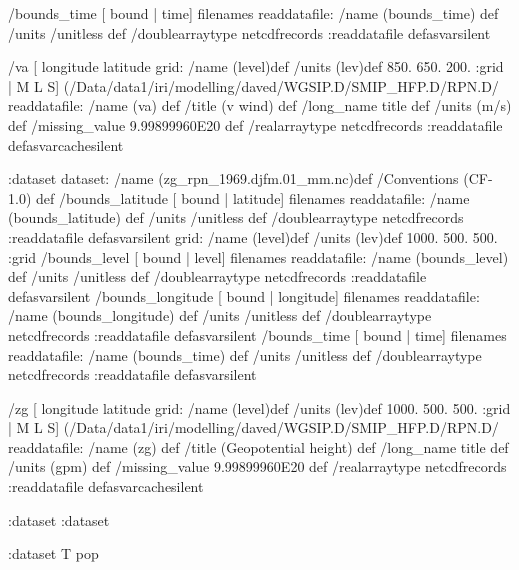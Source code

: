  /bounds_time{
[ bound | time] filenames readdatafile:
/name (bounds_time) def
 /units /unitless def
 /doublearraytype netcdfrecords :readdatafile
}defasvarsilent
\begin{ingrid}
 /va{
[ longitude latitude
grid:
/name (level)def
/units (lev)def
 850. 650. 200.
:grid
 | M L S]
(/Data/data1/iri/modelling/daved/WGSIP.D/SMIP_HFP.D/RPN.D/%
readdatafile:
/name (va) def
 /title (v wind) def
/long_name title def
 /units (m/s) def
 /missing_value 9.99899960E20 def
 /realarraytype netcdfrecords :readdatafile
}defasvarcachesilent
\end{ingrid}
:dataset
dataset:
/name (zg_rpn_1969.djfm.01_mm.nc)def
 /Conventions (CF-1.0) def
 /bounds_latitude{
[ bound | latitude] filenames readdatafile:
/name (bounds_latitude) def
 /units /unitless def
 /doublearraytype netcdfrecords :readdatafile
}defasvarsilent
grid:
/name (level)def
/units (lev)def
 1000. 500. 500.
:grid
 /bounds_level{
[ bound | level] filenames readdatafile:
/name (bounds_level) def
 /units /unitless def
 /doublearraytype netcdfrecords :readdatafile
}defasvarsilent
 /bounds_longitude{
[ bound | longitude] filenames readdatafile:
/name (bounds_longitude) def
 /units /unitless def
 /doublearraytype netcdfrecords :readdatafile
}defasvarsilent
 /bounds_time{
[ bound | time] filenames readdatafile:
/name (bounds_time) def
 /units /unitless def
 /doublearraytype netcdfrecords :readdatafile
}defasvarsilent
\begin{ingrid}
 /zg{
[ longitude latitude 
grid:
/name (level)def
/units (lev)def
 1000. 500. 500.
:grid
| M L S]
(/Data/data1/iri/modelling/daved/WGSIP.D/SMIP_HFP.D/RPN.D/%
readdatafile:
/name (zg) def
 /title (Geopotential height) def
/long_name title def
 /units  (gpm) def
 /missing_value 9.99899960E20 def
 /realarraytype netcdfrecords :readdatafile
}defasvarcachesilent
\end{ingrid}
:dataset
:dataset
\begin{ingrid}
:dataset
T pop
\end{ingrid}